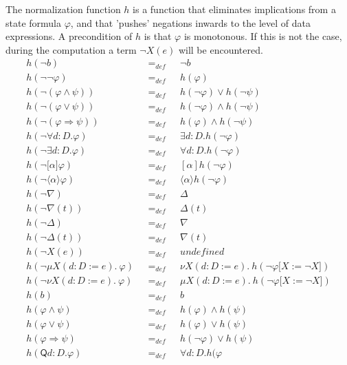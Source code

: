 \documentclass{article}
\begin{document}
The normalization function $h$ is a function that eliminates implications
from a state formula $\varphi $, and that 'pushes' negations inwards to the
level of data expressions. A precondition of $h$ is that $\varphi $ is
monotonous. If this is not the case, during the computation a term $\lnot
X(e)$ will be encountered.%
\begin{equation*}
\begin{array}{lll}
h(\lnot b) & =_{def} & \lnot b \\
h(\lnot \lnot \varphi ) & =_{def} & h(\varphi ) \\
h(\lnot (\varphi \wedge \psi )) & =_{def} & h(\lnot \varphi )\vee h(\lnot
\psi ) \\
h(\lnot (\varphi \vee \psi )) & =_{def} & h(\lnot \varphi )\wedge h(\lnot
\psi ) \\
h(\lnot (\varphi \Rightarrow \psi )) & =_{def} & h(\varphi )\wedge h(\lnot
\psi ) \\
h(\lnot \forall d{{:}D}.\varphi ) & =_{def} & \exists d{{:}D}.h(\lnot
\varphi ) \\
h(\lnot \exists d{{:}D}.\varphi ) & =_{def} & \forall d{{:}D}.h(\lnot
\varphi ) \\
h(\lnot \lbrack \alpha ]\varphi ) & =_{def} & [\alpha ]h(\lnot \varphi ) \\
h(\lnot \langle \alpha \rangle \varphi ) & =_{def} & \langle \alpha \rangle
h(\lnot \varphi ) \\
h(\lnot \nabla ) & =_{def} & \Delta \\
h(\lnot \nabla (t)) & =_{def} & \Delta (t) \\
h(\lnot \Delta ) & =_{def} & \nabla \\
h(\lnot \Delta (t)) & =_{def} & \nabla (t) \\
h(\lnot X(e)) & =_{def} & undefined \\
h(\lnot \mu X(d{:}D:=e).~\varphi )~~~ & =_{def}~~~ & \nu X(d{:}%
D:=e).~h(\lnot \varphi \lbrack X:=\lnot X]) \\
h(\lnot \nu X(d{:}D:=e).~\varphi )~~~ & =_{def}~~~ & \mu X(d{:}%
D:=e).~h(\lnot \varphi \lbrack X:=\lnot X]) \\
h(b) & =_{def} & b \\
h(\varphi \wedge \psi ) & =_{def} & h(\varphi )\wedge h(\psi ) \\
h(\varphi \vee \psi ) & =_{def} & h(\varphi )\vee h(\psi ) \\
h(\varphi \Rightarrow \psi ) & =_{def} & h(\lnot \varphi )\vee h(\psi ) \\
h(\mathsf{Q}d{{:}D}.\varphi ) & =_{def} & \mathsf{\forall }d{{:}D}.h(\varphi

\end{array}
\end{equation*}
\end{document}
